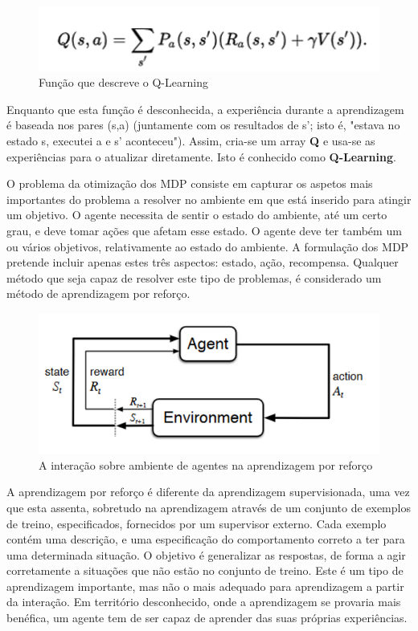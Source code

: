 \begin{figure}[H]
    \centering
    \includegraphics{img/rl1.png}
    \caption{Função que descreve o Q-Learning}
    \label{fig:figura}
\end{figure}


Enquanto que esta função é desconhecida, a experiência durante a aprendizagem é baseada nos pares (s,a)  (juntamente com os resultados de s'; isto é, "estava no estado s, executei a e s' aconteceu"). Assim, cria-se um array \textbf{Q} e usa-se as experiências para o atualizar diretamente. Isto é conhecido como \textbf{Q-Learning}.


O problema da otimização dos MDP consiste em capturar os aspetos mais importantes do problema a resolver no ambiente em que está inserido para atingir um objetivo.
O agente necessita de sentir o estado do ambiente, até um certo grau, e deve tomar ações que afetam esse estado. O agente deve ter também um ou vários objetivos, relativamente ao estado do ambiente. A formulação dos MDP pretende incluir apenas estes três aspectos: estado, ação, recompensa. Qualquer método que seja capaz de resolver este tipo de problemas, é considerado um método de aprendizagem por reforço.


\begin{figure}[H]
    \centering
    \includegraphics{img/rl2.png}
    \caption{A interação sobre ambiente de agentes na aprendizagem por reforço}
    \label{fig:figura}
\end{figure}

 A aprendizagem por reforço é diferente da aprendizagem supervisionada, uma vez que esta assenta, sobretudo na aprendizagem através de um conjunto de exemplos de treino, especificados, fornecidos por um supervisor externo. Cada exemplo contém uma descrição, e uma especificação do comportamento correto a ter para uma determinada situação. O objetivo é generalizar as respostas, de forma a agir corretamente a situações que não estão no conjunto de treino. Este é um tipo de aprendizagem importante, mas não o mais adequado para aprendizagem a partir da interação. Em território desconhecido, onde a aprendizagem se provaria mais benéfica, um agente tem de ser capaz de aprender das suas próprias experiências.

